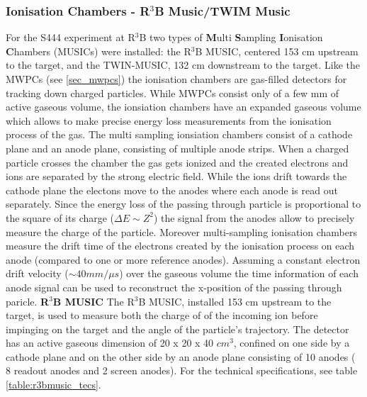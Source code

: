 \subsubsection{Ionisation Chambers - R$^3$B Music/TWIM Music}\label{sec:ionisation_chambers}
For the S444 experiment at R$^3$B two types of \textbf{M}ulti \textbf{S}ampling \textbf{I}onisation \textbf{C}hambers (MUSICs) were installed: the R$^3$B MUSIC, centered 153 cm upstream to the target, and the TWIN-MUSIC, 132 cm downstream to the target. Like the MWPCs (see \ref{sec_mwpcs}) the ionisation chambers are gas-filled detectors for tracking down charged particles. While MWPCs consist only of a few mm of active gaseous volume, the ionsiation chambers have an expanded gaseous volume which allows to make precise energy loss measurements from the ionisation process of the gas. The multi sampling ionsiation chambers consist of a cathode plane and an anode plane, consisting of multiple anode strips. When a charged particle crosses the chamber the gas gets ionized and the created electrons and ions are separated by the strong electric field. While the ions drift towards the cathode plane the electons move to the anodes where each anode is read out separately. Since the energy loss of the passing through particle is proportional to the square of its charge ($\Delta E \sim Z^2$) the signal from the anodes allow to precisely measure the charge of the particle. Moreover multi-sampling ionisation chambers measure the drift time of the electrons created by the ionisation process  on each anode (compared to one or more reference anodes). Assuming a constant electron drift velocity ($\sim 40 mm/\mu s$) over the gaseous volume the time information of each anode signal can be used to reconstruct the x-position of the passing through paricle.\newline
\textbf{R$^3$B MUSIC}\newline
The R$^3$B MUSIC, installed 153 cm upstream to the target, is used to measure both the  charge of of the incoming ion before impinging on the target and the angle of the particle's trajectory. The detector has an active gaseous dimension of 20 x 20 x 40 $cm^3$, confined on one side by a cathode plane and on the other side by an anode plane consisting of 10 anodes ( 8 readout anodes and 2 screen anodes). For the technical specifications, see table \ref{table:r3bmusic_tecs}. \newline
